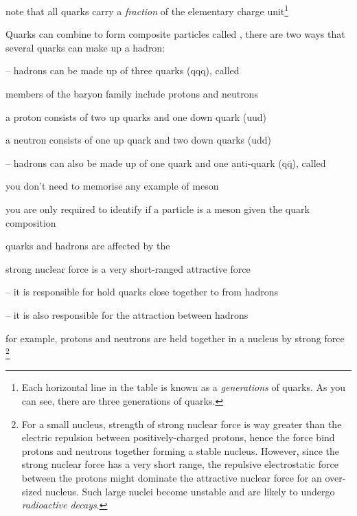 note that all quarks carry a \emph{fraction} of the elementary charge unit\footnote{Each horizontal line in the table is known as a \emph{generations} of quarks. As you can see, there are three generations of quarks.}

Quarks can combine to form composite particles called  , there are two ways that several quarks can make up a hadron:

\begin{compactenum}
	\item[--] hadrons can be made up of three quarks (qqq), called  
	
	members of the baryon family include protons and neutrons
	
	a proton consists of two up quarks and one down quark (uud) 
	
	a neutron consists of one up quark and two down quarks (udd) 
	
	\item[--] hadrons can also be made up of one quark and one anti-quark (q$\bar{\text{q}}$), called  
	
	you don't need to memorise any example of meson
	
	you are only required to identify if a particle is a meson given the quark composition
\end{compactenum}

\cmt quarks and hadrons are affected by the 

strong nuclear force is a very short-ranged attractive force

\begin{compactenum}
	\item[--] it is responsible for hold quarks close together to from hadrons

	\item[--] it is also responsible for the attraction between hadrons
	
	for example, protons and neutrons are held together in a nucleus by strong force
	\footnote{For a small nucleus, strength of strong nuclear force is way greater than the electric repulsion between positively-charged protons, hence the force bind protons and neutrons together forming a stable nucleus. However, since the strong nuclear force has a very short range, the repulsive electrostatic force between the protons might dominate the attractive nuclear force for an over-sized nucleus. Such large nuclei become unstable and are likely to undergo \emph{radioactive decays}.}
\end{compactenum}


